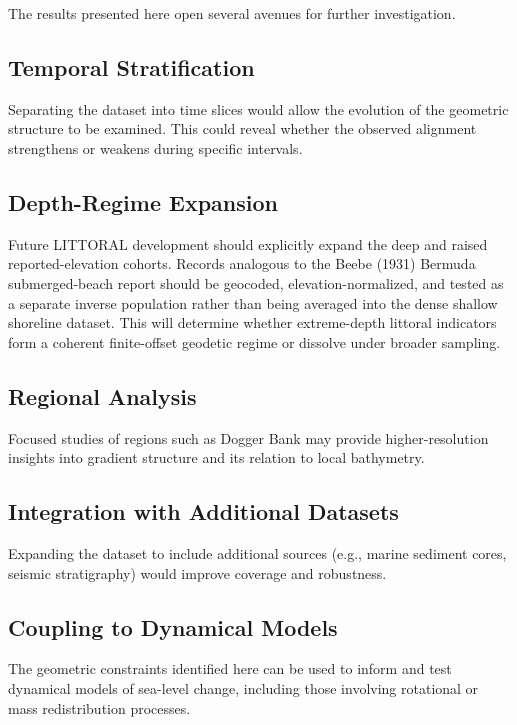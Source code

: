 \documentclass[twocolumn,10pt]{article}
\begin{document}
The results presented here open several avenues for further investigation.

\subsection{Temporal Stratification}

Separating the dataset into time slices would allow the evolution of the geometric structure to be examined. This could reveal whether the observed alignment strengthens or weakens during specific intervals.

\subsection{Depth-Regime Expansion}

Future LITTORAL development should explicitly expand the deep and raised reported-elevation cohorts. Records analogous to the Beebe (1931) Bermuda submerged-beach report should be geocoded, elevation-normalized, and tested as a separate inverse population rather than being averaged into the dense shallow shoreline dataset. This will determine whether extreme-depth littoral indicators form a coherent finite-offset geodetic regime or dissolve under broader sampling.

\subsection{Regional Analysis}

Focused studies of regions such as Dogger Bank may provide higher-resolution insights into gradient structure and its relation to local bathymetry.

\subsection{Integration with Additional Datasets}

Expanding the dataset to include additional sources (e.g., marine sediment cores, seismic stratigraphy) would improve coverage and robustness.

\subsection{Coupling to Dynamical Models}

The geometric constraints identified here can be used to inform and test dynamical models of sea-level change, including those involving rotational or mass redistribution processes.
\end{document}
